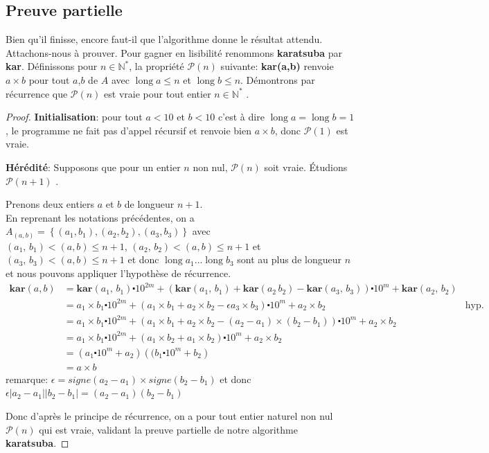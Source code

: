 \documentclass[11pt,french]{article}
\theoremstyle{plain}
\newtheorem*{proof}{Preuve}
\DeclareMathOperator{\lgd}{long}
\newcommand{\ka}{\textbf{kar}}
\newcommand{\x}{\times}
\newcommand{\cd}{\centerdot}
\begin{document}
\subsection{Preuve partielle}
Bien qu'il finisse, encore faut-il que l'algorithme donne le résultat attendu. Attachons-nous à prouver. Pour gagner en lisibilité renommons \textbf{karatsuba} par \ka.
\vskip 0.5cm
Définissons pour $n\in \mathbb{N}^*$,  la propriété $\mathcal{P}(n)$ suivante: \textbf{kar(a,b)} renvoie $a\x b$ pour tout $a$,$b$ de $A$ avec $\lgd a\leqslant n $ et $\lgd b\leqslant n$.
Démontrons par récurrence que $\mathcal{P}(n)$ est vraie pour tout entier $n\in \mathbb{N}^*$ .
\begin{proof}
   \textbf{ Initialisation}: pour tout $a<10$ et $b<10$ c'est à dire $\lgd a = \lgd b =1$, le programme ne fait pas d'appel récursif et renvoie bien $a\times b$, donc $\mathcal{P}(1)$ est vraie.
   
   \textbf{Hérédité}: 
   Supposons que pour un entier $n$ non nul, $\mathcal{P}(n)$ soit vraie. Étudions  $\mathcal{P}(n+1)$ .
   
   Prenons deux entiers $a$ et $b$ de longueur $n+1$.\\ En reprenant les notations précédentes, on a  $A_{(a,b)} = \left\lbrace (a_1,b_1),(a_2,b_2),(a_3,b_3) \right\rbrace $ avec 
    $(a_1,\, b_1)<(a,b)\leqslant n+1,\,(a_2,\, b_2)<(a,b)\leqslant n+1$ et $(a_3, \, b_3)<(a,b)\leqslant n+1$ et donc $\lgd a_1$...$\lgd b_3$ sont au plus de longueur $n$ et nous pouvons appliquer l'hypothèse de récurrence.
    \medskip
  \begin{align*}
  \ka(a,b)&=\ka(a_1,\, b_1)\cd 10^{2m}+\left( \ka(a_1,\, b_1)+\ka(a_2\, b_2)-\ka(a_3,\, b_3)\right) \cd 10^m+\ka(a_2,\, b_2)\\
  &= a_1\x b_1\cd 10^{2m}+\left( a_1\x b_1+ a_2\x b_2-\epsilon a_3 \x b_3\right) \cd 10^m+ a_2\x b_2 &\text{hyp. rec}\\
  &= a_1\x b_1\cd 10^{2m}+\left( a_1\x b_1+ a_2\x b_2- (a_2-a_1)\x (b_2-b_1)\right) \cd 10^m+ a_2\x b_2 \\
  &= a_1\x b_1\cd 10^{2m}+\left( a_1\x b_2+ a_1\x b_2\right) \cd 10^m+ a_2\x b_2\\
  &=\left( a_1\cd 10^m+a_2\right) \left( ( b_1\cd 10^m+b_2\right)  \\
  &=a\x b
  \end{align*}  
   remarque:  $\epsilon = signe(a_2-a_1)\x signe(b_2-b_1)$ et donc $\epsilon \left|a_2-a_1 \right| \left|b_2-b_1 \right|=\left(a_2-a_1 \right) \left(b_2-b_1 \right)$
   
   \medskip
   Donc d'après le principe de récurrence, on a pour tout entier naturel non nul $\mathcal{P}(n)$ qui est vraie, validant la preuve partielle de notre algorithme \textbf{karatsuba}.
\end{proof}
\end{document}
